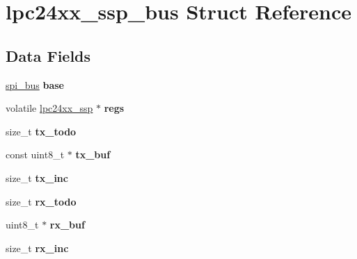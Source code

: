 \hypertarget{structlpc24xx__ssp__bus}{}\section{lpc24xx\+\_\+ssp\+\_\+bus Struct Reference}
\label{structlpc24xx__ssp__bus}
\subsection*{Data Fields}
\begin{DoxyCompactItemize}
\item 
\mbox{\label{structlpc24xx__ssp__bus_a59dea8fc948e0b620b1484c4a8437aba}} 
\mbox{\hyperlink{structspi__bus}{spi\+\_\+bus}} {\bfseries base}
\item 
\mbox{\label{structlpc24xx__ssp__bus_a068eae0077dc29587a789a442261de77}} 
volatile \mbox{\hyperlink{structlpc24xx__ssp}{lpc24xx\+\_\+ssp}} $\ast$ {\bfseries regs}
\item 
\mbox{\label{structlpc24xx__ssp__bus_a0537c5aec3e6c4b9b2b8c481aa4dde36}} 
size\+\_\+t {\bfseries tx\+\_\+todo}
\item 
\mbox{\label{structlpc24xx__ssp__bus_a90f6c9f11b683d8b9ef2e493607efc41}} 
const uint8\+\_\+t $\ast$ {\bfseries tx\+\_\+buf}
\item 
\mbox{\label{structlpc24xx__ssp__bus_ad1aaa0172416044c74c7a552ac163640}} 
size\+\_\+t {\bfseries tx\+\_\+inc}
\item 
\mbox{\label{structlpc24xx__ssp__bus_a2083726fdf21fd0fd8cb261bb7ae85b9}} 
size\+\_\+t {\bfseries rx\+\_\+todo}
\item 
\mbox{\label{structlpc24xx__ssp__bus_ac00926c1648298bb5d2bcf7c809f11d0}} 
uint8\+\_\+t $\ast$ {\bfseries rx\+\_\+buf}
\item 
\mbox{\label{structlpc24xx__ssp__bus_a53b5f3b34e9679127322bdcd98c08448}} 
size\+\_\+t {\bfseries rx\+\_\+inc}
\item 
\mbox{\label{structlpc24xx__ssp__bus_a9b8d6a7e4e7f94f61c96aae5dc020ddb}} 

\end{DoxyCompactItemize}
